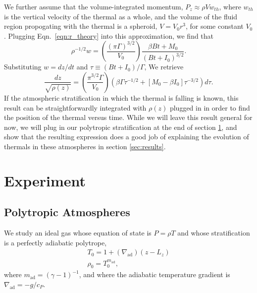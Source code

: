 \documentclass[twocolumn, amsmath, amsfonts, amssymb, trackchanges]{aastex62}
\newcommand{\grad}{\ensuremath{\nabla}}
\begin{document}
We further assume that the volume-integrated momentum, $P_z \approx \rho V w_{th}$,
where $w_{th}$ is the vertical velocity of the thermal as a whole, and the volume
of the fluid region propogating with the thermal is a spheroid, $V = V_0 r^3$, for
some constant $V_0$. Plugging Eqn.~\ref{eqn:r_theory} into this approximation, we
find that
\begin{equation}
\rho^{-1/2}w = \left(\frac{(\pi\Gamma)^{3/2}}{V_0}\right)\frac{\beta B t + M_0}{(B t + I_0)^{3/2}}.
\end{equation}
Substituting $w = dz/dt$ and $\tau \equiv (Bt + I_0)/\Gamma$, We retrieve
\begin{equation}
\frac{dz}{\sqrt{\rho(z)}} 
= \left(\frac{\pi^{3/2}\Gamma}{V_0}\right)
\left(\beta\Gamma\tau^{-1/2} + [M_0 - \beta I_0]\tau^{-3/2}\right)d\tau.
\end{equation}
If the atmospheric stratification in which the thermal is falling is known, this
result can be straightforwardly integrated with $\rho(z)$ plugged in in order to
find the position of the thermal versus time. While we will leave this result
general for now, we will plug in our polytropic stratification at the end of
section \ref{sec:experiment}, and show that the resulting expression does a
good job of explaining the evolution of thermals in these atmospheres in
section \ref{sec:results}.

\section{Experiment} 
\label{sec:experiment}

\subsection{Polytropic Atmospheres}
We study an ideal gas whose equation of state is $P = \rho T$ and whose stratification
is a perfectly adiabatic polytrope,
\begin{gather}
T_0 = 1 + (\grad_{\text{ad}})(z - L_z) \\
\rho_0 = T_0^{m_{\text{ad}}},
\end{gather}
where $m_{\text{ad}} = (\gamma-1)^{-1}$, and where the adiabatic 
temperature gradient is $\grad_{\text{ad}} = - g / c_P$.
\end{document}
